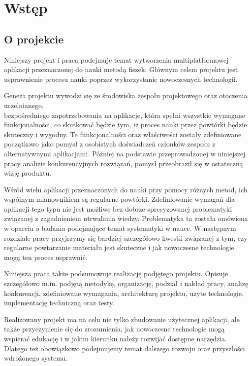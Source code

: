 \chapter{Wstęp}

\section{O projekcie}\label{ch:wstep}

Niniejszy projekt i praca podejmuje temat wytworzenia multiplatformowej aplikacji przeznaczonej do nauki metodą fiszek. Głównym celem projektu jest usprawnienie procesu nauki poprzez wykorzystanie nowoczesnych technologii.

Geneza projektu wywodzi się ze środowiska zespołu projektowego oraz otoczenia uczelnianego, \\bezpośredniego zapotrzebowania na aplikacje, która spełni wszystkie wymagane funkcjonalności, co skutkować będzie tym, iż proces nauki przez powtórki będzie skuteczny i wygodny. Te funkcjonalności oraz właściwości zostały zdefiniowane początkowo jako pomysł z osobistych doświadczeń członków zespołu z alternatywnymi aplikacjami. Później na podstawie przeprowadzonej w niniejszej pracy analizie konkurencyjnych rozwiązań, pomysł przeobraził się w ostateczną wizję produktu.

Wśród wielu aplikacji przeznaczonych do nauki przy pomocy różnych metod, ich wspólnym mianownikiem są regularne powtórki. Zdefiniowanie wymagań dla aplikacji tego typu nie jest możliwe bez dobrze sprecyzowanej problematyki związanej z zagadnieniem utrwalania wiedzy. Problematyka ta została omówiona w oparciu o badania podejmujące temat systematyki w nauce. W następnym rozdziale pracy przyjrzymy się bardziej szczegółowo kwestii związanej z tym, czy regularne powtarzanie materiału jest skuteczne i jak nowoczesne technologie mogą ten proces usprawnić.

Niniejsza praca także podsumowuje realizację podjętego projektu. Opisuje szczegółowo m.in. podjętą metodykę, organizację, podział i nakład pracy, analizę konkurencji, zdefiniowane wymagania, architekturę projektu, użyte technologie, implementację techniczną oraz testy.

Realizowany projekt ma na celu nie tylko zbudowanie użytecznej aplikacji, ale także przyczynienie się do zrozumienia, jak nowoczesne technologie mogą wspierać edukację i w jakim kierunku należy rozwijać dostępne narzędzia. Dlatego też obowiązkowo podejmujemy temat dalszego rozwoju oraz przyszłości wdrożonego systemu.
